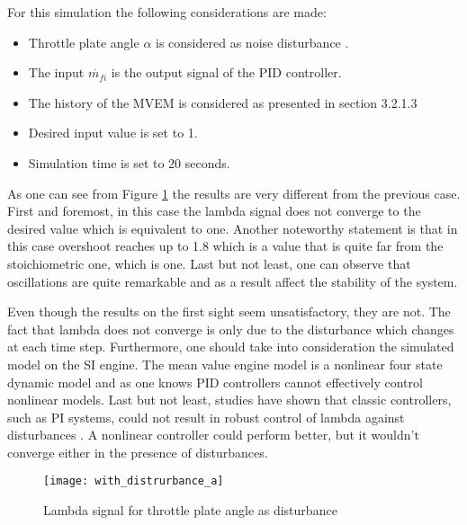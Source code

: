 For this simulation the following considerations are made:

\begin{itemize}
	\item Throttle plate angle $\alpha$ is considered as noise disturbance .
	\item The  input $\dot{m_{fi}}$ is the output signal of the PID controller. 
	\item The history of the MVEM is considered as presented in section 3.2.1.3 
	\item Desired input value is set to 1.
	\item Simulation time is set to 20 seconds.
\end{itemize} 
As one can see from Figure \ref{fig:adisturbance} the results are very different from the previous case. First and foremost, in this case the lambda signal does not converge to the desired value which is equivalent to one. Another noteworthy statement is that in this case overshoot reaches up to 1.8 which is a value that is quite far from the stoichiometric one, which is one. Last but not least, one can observe that oscillations are quite remarkable and as a result affect the stability of the system.

Even though the results on the first sight seem unsatisfactory, they are not. The fact that lambda does not converge is only due to the disturbance which changes at each time step. Furthermore, one should take into consideration the simulated model on the SI engine. The mean value engine model is a nonlinear four state dynamic model and as one knows PID controllers cannot effectively control nonlinear models.
Last but not least, studies have shown that classic controllers, such as PI systems, could not result in robust control of lambda against disturbances \cite{lambdacontrol}. A nonlinear controller could perform better, but it wouldn't converge either in the presence of disturbances. 
\\

\begin{figure}[ht!]
    \centering
    \texttt{[image: with\_distrurbance\_a]}
    \caption{Lambda signal for throttle plate angle as disturbance}
    \label{fig:adisturbance}
\end{figure}

